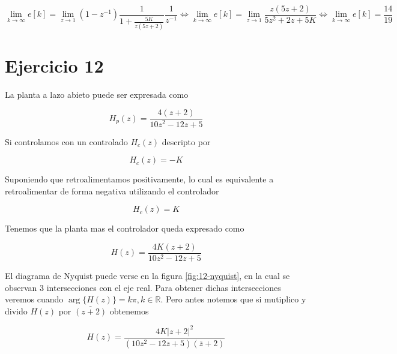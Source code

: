 \documentclass{article}
\begin{document}
            \begin{equation}
                \lim_{k \to \infty} e[k] = \lim_{z \to 1} (1-z^{-1}) \frac{1}{1 + \frac{5K}{z(5z + 2)}} \frac{1}{z^{-1}} \Leftrightarrow
                \lim_{k \to \infty} e[k] = \lim_{z \to 1} \frac{z(5z+2)}{5z^2 + 2z + 5K} \Leftrightarrow
                \lim_{k \to \infty} e[k] = \frac{14}{19}
            \end{equation}

    \section{Ejercicio 12}
    
        La planta a lazo abieto puede ser expresada como 
        
        \begin{equation}
            H_p(z) = \frac{4(z+2)}{10z^2 - 12z + 5}
        \end{equation}

        Si controlamos con un controlado $H_c(z)$ descripto por 
        
        \begin{equation}
            H_c(z) = -K
        \end{equation}

        Suponiendo que retroalimentamos positivamente, lo cual es equivalente a retroalimentar de forma negativa utilizando el controlador 
        
        \begin{equation}
            H_c(z) = K
        \end{equation}

        Tenemos que la planta mas el controlador queda expresado como 

        \begin{equation}
            H(z) = \frac{4K(z+2)}{10z^2 - 12z +5}
        \end{equation}

        El diagrama de Nyquist puede verse en la figura \ref{fig:12-nyquist}, en la cual se observan 3 intersecciones con el eje real. 
        Para obtener dichas intersecciones veremos cuando $\arg\{H(z)\} = k\pi, k \in \mathbb{R}$. Pero antes notemos que si mutiplico y
        divido $H(z)$ por $\bar{(z+2)}$ obtenemos 

        \begin{equation}
            H(z) = \frac{4K|z+2|^2}{(10z^2 - 12z +5)(\bar{z} + 2)}
        \end{equation}
\end{document}
